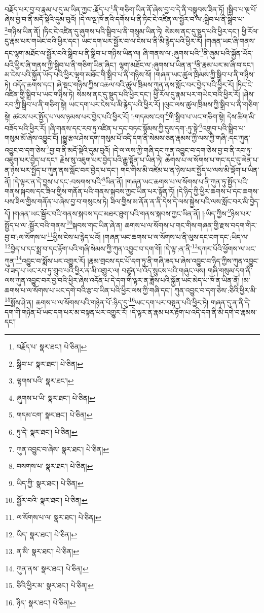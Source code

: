 བརྗོད་པར་བྱ་བ་རྣམ་པ་དུ་མ་ཡིན་ཀྱང་:རྗོད་པ་\footnote{བརྗོད་པ་  སྣར་ཐང་།  པེ་ཅིན། }ནི་གཅིག་ཡིན་ནོ་ཞེས་བྱ་བ་དེ་ནི་བསྒྲུབས་ཟིན་ཏོ། །སྒྲིབ་པ་ལྔ་པོ་ཞེས་བྱ་བ་ནི་མདོ་སྡེའི་དུམ་བུའོ། །དེ་ལ་ལྔ་ཁོ་ནའི་དགོས་པ་ནི་ཏིང་ངེ་འཛིན་ལ་སྦྱོར་བ་ལ་:སྒྲིབ་པ་ནི་སྒྲིབ་པ་\footnote{སྒྲིབ་པ་  སྣར་ཐང་།  པེ་ཅིན། }གཉིས་ཡིན་ནོ། །ཏིང་ངེ་འཛིན་དུ་ཞུགས་པའི་སྒྲིབ་པ་ནི་གསུམ་ཡིན་ཏེ། སེམས་ནང་དུ་སྡུད་པའི་ཕྱིར་དང་། ཕྱི་རོལ་དུ་རྣམ་པར་གཡེང་བའི་ཕྱིར་དང་། ཡང་དག་པར་སྦྱོར་བ་ལ་ངེས་པ་ནི་མི་རྙེད་པའི་ཕྱིར་རོ། །གཞན་ཡང་ཞི་གནས་དང་ལྷག་མཐོང་ལ་སྦྱོར་བའི་སྒྲིབ་པ་ནི་སྒྲིབ་པ་གཉིས་ཡིན་ལ། ཞི་གནས་ལ་:ཞུགས་པའི་\footnote{ལྷགས་པའི་  སྣར་ཐང་། }ནི་ཞུམ་པའི་སྐྱོན་ཡོད་པའི་ཕྱིར་ཞི་གནས་ཀྱི་སྒྲིབ་པ་ནི་གཅིག་ཡིན་ཞིང་། ལྷག་མཐོང་ལ་:ཞུགས་པ་ཡིན་ན་\footnote{ཞུགས་པ་ཡི་  སྣར་ཐང་།  པེ་ཅིན། }ནི་རྣམ་པར་མ་ཞི་བ་དང་། མ་ངེས་པའི་སྐྱོན་ཡོད་པའི་ཕྱིར་ལྷག་མཐོང་གི་སྒྲིབ་པ་ནི་གཉིས་སོ། །གཞན་ཡང་ཚུལ་ཁྲིམས་ཀྱི་སྒྲིབ་པ་ནི་གཉིས་ཏེ། འདོད་ཆགས་དང་། ཞེ་སྡང་གཉིས་ཀྱིས་འཆལ་བའི་ཚུལ་ཁྲིམས་ཀུན་ནས་སློང་བར་བྱེད་པའི་ཕྱིར་རོ། །ཏིང་ངེ་འཛིན་གྱི་སྒྲིབ་པ་ཡང་གཉིས་ཏེ། སེམས་ནང་དུ་སྡུད་པའི་ཕྱིར་དང་། ཕྱི་རོལ་དུ་རྣམ་པར་གཡེང་བའི་ཕྱིར་རོ། །ཤེས་རབ་ཀྱི་སྒྲིབ་པ་ནི་གཅིག་སྟེ། ཡང་དག་པར་ངེས་པ་མི་རྙེད་པའི་ཕྱིར་རོ། །ལུང་ལས་ཚུལ་ཁྲིམས་ཀྱི་སྒྲིབ་པ་ནི་གཅིག་སྟེ། ཚངས་པར་སྤྱོད་པ་ལས་ཉམས་པར་བྱེད་པའི་ཕྱིར་རོ། །:གདམས་ངག་\footnote{གདམ་ངག་  སྣར་ཐང་།  པེ་ཅིན། }གི་སྒྲིབ་པ་ཡང་གཅིག་སྟེ། དེས་ཚིག་མི་བཟོད་པའི་ཕྱིར་རོ། །ཞི་གནས་དང་རབ་ཏུ་འཛིན་པ་དང་བཏང་སྙོམས་ཀྱི་དུས་དག་:ཏུ་སྟེ་\footnote{ཏུ་དེ་  སྣར་ཐང་།  པེ་ཅིན། }འགྲུབ་པའི་སྒྲིབ་པ་གསུམ་མོ་ཞེས་འབྱུང་ངོ། །སྒྱུ་རྩལ་ཤེས་དག་གསུམ་པོ་འདི་དག་ནི་སེམས་ཅན་རྣམས་ཀྱི་ལས་ཀྱི་གཞི་:དང་ཀུན་འབྱུང་བ་དག་ཅེས་\footnote{ཀུན་འབྱུང་བ་ཞེས་  སྣར་ཐང་།  པེ་ཅིན། }བྱ་བ་ནི་མདོ་སྡེའི་དུམ་བུའོ། །དེ་ལ་ལས་ཀྱི་གཞི་དང་ཀུན་འབྱུང་བ་དག་ཅེས་བྱ་བ་ནི་རབ་ཏུ་འཇུག་པར་བྱེད་པ་དང་། རྗེས་སུ་འཇུག་པར་བྱེད་པའི་རྒྱུ་སྟོན་པ་ཡིན་ཏེ། ཆགས་པ་ལ་སོགས་པ་གང་དང་དུ་ལེན་པ་ན་ཉེས་པར་སྤྱོད་པ་ཀུན་ནས་སློང་བར་བྱེད་པ་དང་། གང་གིས་མི་འཛེམ་པ་ན་ཉེས་པར་སྤྱོད་པ་ལས་མི་ལྡོག་པ་ཡིན་ནོ། །དེ་ལྟར་ན་དེ་བྱས་པ་དང་:བསགས་པའི་\footnote{བསགས་པ་  སྣར་ཐང་།  པེ་ཅིན། }ཡིན་ནོ། །གཞན་ཡང་ཆགས་པ་ལ་སོགས་པ་ནི་ཀུན་ཏུ་སྤྱོད་པའི་གནས་སྐབས་དང་ཟིལ་གྱིས་གནོན་པའི་གནས་སྐབས་ཀྱང་ཡིན་པར་སྟོན་ཏོ། །དེ་ཉིད་ཀྱི་ཕྱིར་ཆགས་པ་དང་ཆགས་པས་ཟིལ་གྱིས་གནོན་པ་ཞེས་བྱ་བ་གསུངས་ཏེ། ཟིལ་གྱིས་མ་ནོན་ན་ནི་དེས་དེ་ལས་སྐྱེས་པའི་ལས་སློང་བར་མི་བྱེད་དོ། །གཞན་ཡང་སྦྱོར་བའི་གནས་སྐབས་དང་མཐར་ཐུག་པའི་གནས་སྐབས་ཀྱང་ཡིན་ནོ། །:ཡིད་ཀྱིས་\footnote{ཡིད་ཀྱི་  སྣར་ཐང་།  པེ་ཅིན། }ཉེས་པར་སྤྱོད་པ་ལ་:སྦྱོར་བའི་གནས་\footnote{སྦྱོར་བའི་  སྣར་ཐང་།  པེ་ཅིན། }སྐབས་གང་ཡིན་ཞེ་ན། ཆགས་པ་ལ་སོགས་པ་གང་གིས་གཞན་གྱི་རྫས་བདག་གིར་བྱ་བ་:ལ་སོགས་པ་\footnote{ལ་སོགས་པ་ལ་  སྣར་ཐང་།  པེ་ཅིན། }ཕྱིས་ངེས་པ་རྙེད་པའོ། །གཞན་ཡང་ཆགས་པ་ལ་སོགས་པ་ནི་ལུས་དང་ངག་དང་:ཡིད་ལ་\footnote{ཡིད་  སྣར་ཐང་།  པེ་ཅིན། }བྱེད་པ་དང་སྨྲ་བ་དང་རྟོག་པའི་གཞི་སེམས་ཀྱི་ཀུན་འབྱུང་བ་དག་གོ། །དེ་ལྟ་:ན་ནི་\footnote{ན་མི་  སྣར་ཐང་།  པེ་ཅིན། }དཀར་པོའི་ཕྱོགས་ལ་ཡང་ཀུན་\footnote{ཀུན་ནས་  སྣར་ཐང་།  པེ་ཅིན། }འབྱུང་བ་སྨོས་པར་འགྱུར་རོ། །རྣམ་གྲངས་དང་པོ་དག་ཏུ་ནི་གཞི་ཟད་པ་ཞེས་འབྱུང་བ་ཉིད་ཀྱིས་ཀུན་འབྱུང་བ་ཟད་པ་ཡང་རབ་ཏུ་གྲུབ་པའི་ཕྱིར་ན་མི་འགྱུར་ལ། བཙུན་པ་འོད་སྲུངས་པའི་གཞུང་ལས། གཞི་གསུམ་དག་ནི་ལས་ཀུན་འབྱུང་བར་བྱ་བའི་ཕྱིར་ཞེས་འདོན་པ་དེ་དག་གི་ལྟར་ན་ཟློས་པའི་སྐྱོན་ཡང་མེད་པ་ཁོ་ན་ཡིན་ནོ། །མ་ཆགས་པ་ལ་སོགས་པ་ཡང་དགེ་བའི་རྩ་བ་ཡིན་པའི་ཕྱིར་ལས་ཀྱི་གཞི་དང་། ཀུན་འབྱུང་བ་དག་ཅེས་:ཅིའི་ཕྱིར་མི་\footnote{ཅིའི་ཕྱིར་མ་  སྣར་ཐང་།  པེ་ཅིན། }སྨོས་ཤེ་ན། ཆགས་པ་ལ་སོགས་པའི་གཉེན་པོ་:ཉིད་དུ་\footnote{ཉིད་  སྣར་ཐང་།  པེ་ཅིན། }ཡང་དག་པར་བསྟན་པའི་ཕྱིར་ཏེ། གཞན་དུ་ན་ནི་དེ་དག་གི་གཉེན་པོ་ཡང་དག་པར་མ་བསྟན་པར་འགྱུར་རོ། །དེ་ལྟར་ན་རྣམ་པར་རྟོག་པ་འདི་དག་ནི་མི་དགེ་བ་རྣམས་དང་། 